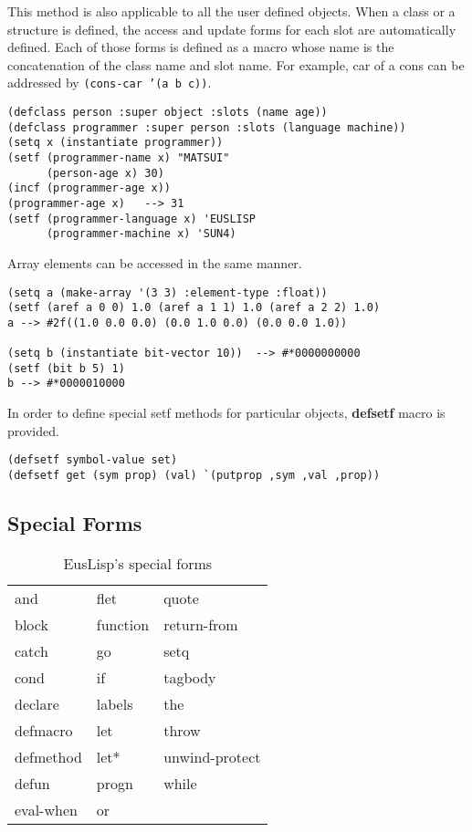 This method is also applicable to all the user defined objects.
When a class or a structure is defined, the access and update forms
for each slot are automatically defined.
Each of those forms is defined as a macro whose name is the concatenation of
the class name and slot name.
For example, car of a cons can be addressed by {\tt (cons-car '(a b c))}.

\begin{verbatim}
(defclass person :super object :slots (name age))
(defclass programmer :super person :slots (language machine))
(setq x (instantiate programmer))
(setf (programmer-name x) "MATSUI"
      (person-age x) 30)
(incf (programmer-age x))
(programmer-age x)   --> 31
(setf (programmer-language x) 'EUSLISP
      (programmer-machine x) 'SUN4)
\end{verbatim}

Array elements can be accessed in the same manner.

\begin{verbatim}
(setq a (make-array '(3 3) :element-type :float))
(setf (aref a 0 0) 1.0 (aref a 1 1) 1.0 (aref a 2 2) 1.0)
a --> #2f((1.0 0.0 0.0) (0.0 1.0 0.0) (0.0 0.0 1.0))

(setq b (instantiate bit-vector 10))  --> #*0000000000
(setf (bit b 5) 1)
b --> #*0000010000
\end{verbatim}

In order to define special setf methods for particular objects,
{\bf defsetf} macro is provided.

\begin{verbatim}
(defsetf symbol-value set)
(defsetf get (sym prop) (val) `(putprop ,sym ,val ,prop))
\end{verbatim}

\subsection{Special Forms}

\begin{table}
\begin{center}
{\large
\begin{tabular}{|l l l|} \hline 
and & flet & quote \\
block & function & return-from\\
catch & go & setq \\
cond & if & tagbody \\
declare & labels & the \\
defmacro & let & throw \\
defmethod & let* & unwind-protect \\
defun & progn & while \\
eval-when & or & \\
\hline
\end{tabular} }
\end{center}
\caption{\label{SpecialForms}EusLisp's special forms}
\end{table}

